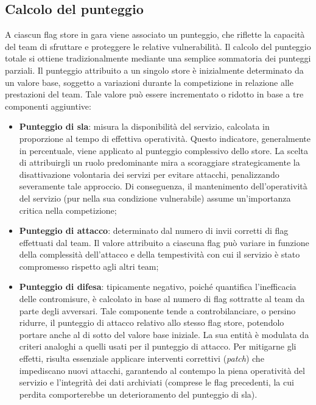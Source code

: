 \subsection{Calcolo del punteggio}

A ciascun flag store in gara viene associato un punteggio, che riflette la capacità del team di sfruttare e proteggere le relative vulnerabilità. Il calcolo del punteggio totale si ottiene tradizionalmente mediante una semplice sommatoria dei punteggi parziali.
Il punteggio attribuito a un singolo store è inizialmente determinato da un valore base, soggetto a variazioni durante la competizione in relazione alle prestazioni del team. Tale valore può essere incrementato o ridotto in base a tre componenti aggiuntive:

\begin{itemize}
    \setlength{\itemsep}{2pt}
    \setlength{\parskip}{2pt}
    \item \textbf{Punteggio di \gls{sla}}: misura la disponibilità del servizio, calcolata in proporzione al tempo di effettiva operatività.
    Questo indicatore, generalmente in percentuale, viene applicato al punteggio complessivo dello store. La scelta di attribuirgli un ruolo predominante mira a scoraggiare strategicamente la disattivazione volontaria dei servizi per evitare attacchi, penalizzando severamente tale approccio. Di conseguenza, il mantenimento dell'operatività del servizio (pur nella sua condizione vulnerabile) assume un'importanza critica nella competizione;

    \item \textbf{Punteggio di attacco}: determinato dal numero di invii corretti di flag effettuati dal team. Il valore attribuito a ciascuna flag può variare in funzione della complessità dell'attacco e della tempestività con cui il servizio è stato compromesso rispetto agli altri team;

    \item \textbf{Punteggio di difesa}: tipicamente negativo, poiché quantifica l'inefficacia delle contromisure, è calcolato in base al numero di flag sottratte al team da parte degli avversari. Tale componente tende a controbilanciare, o persino ridurre, il punteggio di attacco relativo allo stesso flag store, potendolo portare anche al di sotto del valore base iniziale. La sua entità è modulata da criteri analoghi a quelli usati per il punteggio di attacco. Per mitigarne gli effetti, risulta essenziale applicare interventi correttivi (\textit{patch}) che impediscano nuovi attacchi, garantendo al contempo la piena operatività del servizio e l'integrità dei dati archiviati (comprese le flag precedenti, la cui perdita comporterebbe un deterioramento del punteggio di \gls{sla}).
\end{itemize}

